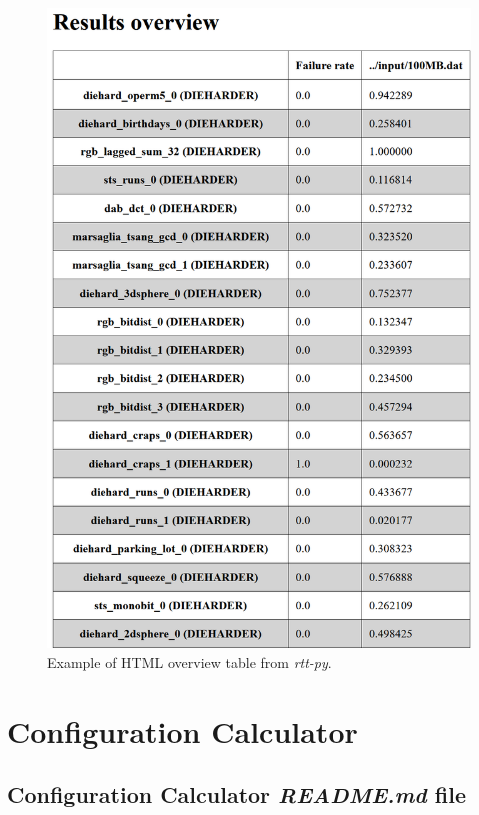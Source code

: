 \documentclass[
  digital,     %
  oneside,     %
  nosansbold,  %
  nocolorbold, %
  nolof,         %
  nolot,         %
]{fithesis4}
\begin{document}
\begin{figure}[h!]
  \begin{center}
    \includegraphics[width=11.5cm]{figures/rtt/rtt-py-table.png}
  \end{center}
  \caption{Example of HTML overview table from \emph{rtt-py}.}
  \label{fig:rtt_py_table_app}
\end{figure}

\newpage
\chapter{Configuration Calculator}

\section{Configuration Calculator \emph{README.md} file} \label{append:cc_readme}
\end{document}
